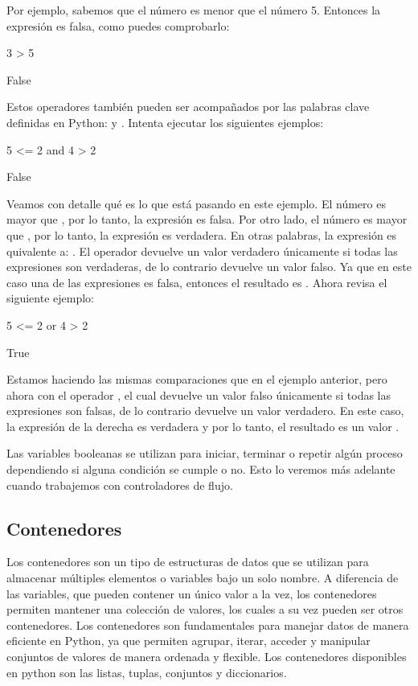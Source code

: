 Por ejemplo, sabemos que el número  es menor que el número 5. Entonces la expresión  es falsa, como puedes comprobarlo:

\begin{pyin}
3 > 5
\end{pyin}
\begin{pyout}
False
\end{pyout}

Estos operadores también pueden ser acompañados por las palabras clave definidas en Python:  y . Intenta ejecutar los siguientes ejemplos:

\begin{pyin}
5 <= 2 and 4 > 2
\end{pyin}
\begin{pyout}
False
\end{pyout}

Veamos con detalle qué es lo que está pasando en este ejemplo. El número  es mayor que , por lo tanto, la expresión  es falsa. Por otro lado, el número  es mayor que , por lo tanto, la expresión  es verdadera. En otras palabras, la expresión es quivalente a: . El operador  devuelve un valor verdadero únicamente si todas las expresiones son verdaderas, de lo contrario devuelve un valor falso. Ya que en este caso una de las expresiones es falsa, entonces el resultado es . Ahora revisa el siguiente ejemplo:

\begin{pyin}
5 <= 2 or 4 > 2
\end{pyin}
\begin{pyout}
True
\end{pyout}

Estamos haciendo las mismas comparaciones que en el ejemplo anterior, pero ahora con el operador , el cual devuelve un valor falso únicamente si todas las expresiones son falsas, de lo contrario devuelve un valor verdadero. En este caso, la expresión de la derecha es verdadera y por lo tanto, el resultado es un valor .

Las variables booleanas se utilizan para iniciar, terminar o repetir algún proceso dependiendo si alguna condición se cumple o no. Esto lo veremos más adelante cuando trabajemos con controladores de flujo.

\subsection{Contenedores}
Los contenedores son un tipo de estructuras de datos que se utilizan para almacenar múltiples elementos o variables bajo un solo nombre. A diferencia de las variables, que pueden contener un único valor a la vez, los contenedores permiten mantener una colección de valores, los cuales a su vez pueden ser otros contenedores. Los contenedores son fundamentales para manejar datos de manera eficiente en Python, ya que permiten agrupar, iterar, acceder y manipular conjuntos de valores de manera ordenada y flexible. Los contenedores disponibles en python son las listas, tuplas, conjuntos y diccionarios.

